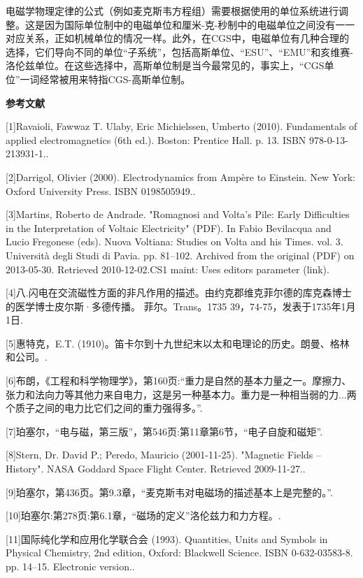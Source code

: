 电磁学物理定律的公式（例如麦克斯韦方程组）需要根据使用的单位系统进行调整。这是因为国际单位制中的电磁单位和厘米-克-秒制中的电磁单位之间没有一一对应关系，正如机械单位的情况一样。此外，在CGS中，电磁单位有几种合理的选择，它们导向不同的单位“子系统”，包括高斯单位、“ESU”、“EMU”和亥维赛-洛伦兹单位。在这些选择中，高斯单位制是当今最常见的，事实上，“CGS单位”一词经常被用来特指CGS-高斯单位制。

\textbf{参考文献}

[1]Ravaioli, Fawwaz T. Ulaby, Eric Michielssen, Umberto (2010). Fundamentals of applied electromagnetics (6th ed.). Boston: Prentice Hall. p. 13. ISBN 978-0-13-213931-1..

[2]Darrigol, Olivier (2000). Electrodynamics from Ampère to Einstein. New York: Oxford University Press. ISBN 0198505949..

[3]Martins, Roberto de Andrade. "Romagnosi and Volta's Pile: Early Difficulties in the Interpretation of Voltaic Electricity" (PDF). In Fabio Bevilacqua and Lucio Fregonese (eds). Nuova Voltiana: Studies on Volta and his Times. vol. 3. Università degli Studi di Pavia. pp. 81–102. Archived from the original (PDF) on 2013-05-30. Retrieved 2010-12-02.CS1 maint: Uses editors parameter (link).

[4]八.闪电在交流磁性方面的非凡作用的描述。由约克郡维克菲尔德的库克森博士的医学博士皮尔斯·多德传播。 菲尔。Trans。1735 39，74-75，发表于1735年1月1日.

[5]惠特克，E.T. (1910)。笛卡尔到十九世纪末以太和电理论的历史。朗曼、格林和公司。.

[6]布朗，《工程和科学物理学》，第160页:“重力是自然的基本力量之一。摩擦力、张力和法向力等其他力来自电力，这是另一种基本力。重力是一种相当弱的力...两个质子之间的电力比它们之间的重力强得多。”.

[7]珀塞尔，“电与磁，第三版”，第546页:第11章第6节，“电子自旋和磁矩”.

[8]Stern, Dr. David P.; Peredo, Mauricio (2001-11-25). "Magnetic Fields – History". NASA Goddard Space Flight Center. Retrieved 2009-11-27..

[9]珀塞尔，第436页。第9.3章，“麦克斯韦对电磁场的描述基本上是完整的。”.

[10]珀塞尔:第278页:第6.1章，“磁场的定义”洛伦兹力和力方程。.

[11]国际纯化学和应用化学联合会 (1993). Quantities, Units and Symbols in Physical Chemistry, 2nd edition, Oxford: Blackwell Science. ISBN 0-632-03583-8. pp. 14–15. Electronic version..